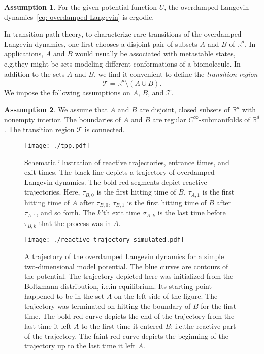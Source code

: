 \documentclass[reqno]{amsart}
\newcommand{\Real}{\mathbb{R}}
\newcommand{\1}{\mathds{1}}
\theoremstyle{definition}
\newtheorem{assumption}{Assumption}
\theoremstyle{remark}
\newcommand{\D}{\mathscr{T}}
\begin{document}
\begin{assumption}\label{asm: ergodicity}
For the given potential function $U$, the overdamped Langevin dynamics~\eqref{eq: overdamped Langevin} is ergodic. 
\end{assumption}


In transition path theory, to characterize rare transitions of the overdamped Langevin dynamics, one first chooses a disjoint pair of subsets $A$ and $B$ of $\Real^d$. In applications, $A$ and $B$ would usually be associated with metastable states, e.g.\@ they might be sets modeling different conformations of a biomolecule. In addition to the sets $A$ and $B$, we find it convenient to define the \emph{transition region}
\begin{equation*}
\D = \Real^d \setminus (A \cup B).
\end{equation*}
We impose the following assumptions on $A$, $B$, and $\D$.

\begin{assumption}\label{asm: submanifold assumption}
  We assume that $A$ and $B$ are disjoint, closed subsets of $\Real^d$ with nonempty interior. The boundaries of $A$ and $B$ are regular $C^\infty$-submanifolds of $\Real^d$. The transition region $\D$ is connected. 
\end{assumption}

\begin{figure}
  \caption{Schematic illustration of reactive trajectories, entrance times, and exit times. The black line depicts a trajectory of overdamped Langevin dynamics. The bold red segments depict reactive trajectories.  Here, $\tau_{B,0}$ is the first hitting time of $B$, $\tau_{A,1}$ is the first hitting time of $A$ after $\tau_{B,0}$, $\tau_{B,1}$ is the first hitting time of $B$ after $\tau_{A,1}$, and so forth. The $k$'th exit time $\sigma_{A,k}$ is the last time before $\tau_{B,k}$ that the process was in $A$.}
  \texttt{[image: ./tpp.pdf]}
  \label{fig: tpp-schematic}
\end{figure}

\begin{figure}
  \caption{A trajectory of the overdamped Langevin dynamics for a simple two-dimensional model potential. The blue curves are contours of the potential. The trajectory depicted here was initialized from the Boltzmann distribution, i.e.\@ in equilibrium. Its starting point happened to be in the set $A$ on the left side of the figure. The trajectory was terminated on hitting the boundary of $B$ for the first time. The bold red curve depicts the end of the trajectory from the last time it left $A$ to the first time it entered $B$; i.e.\@ the reactive part of the trajectory. The faint red curve depicts the beginning of the trajectory up to the last time it left $A$.}
  \texttt{[image: ./reactive-trajectory-simulated.pdf]}
  \label{fig: reactive-trajectory}
\end{figure}
\end{document}
